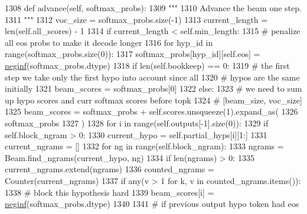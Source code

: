 \begin{DoxyCode}
1308     \textcolor{keyword}{def }advance(self, softmax\_probs):
1309         \textcolor{stringliteral}{"""}
1310 \textcolor{stringliteral}{        Advance the beam one step.}
1311 \textcolor{stringliteral}{        """}
1312         voc\_size = softmax\_probs.size(-1)
1313         current\_length = len(self.all\_scores) - 1
1314         \textcolor{keywordflow}{if} current\_length < self.min\_length:
1315             \textcolor{comment}{# penalize all eos probs to make it decode longer}
1316             \textcolor{keywordflow}{for} hyp\_id \textcolor{keywordflow}{in} range(softmax\_probs.size(0)):
1317                 softmax\_probs[hyp\_id][self.eos] = \hyperlink{namespaceparlai_1_1utils_1_1torch_a6c6e25115353dba479cd72dc31dc76ae}{neginf}(softmax\_probs.dtype)
1318         \textcolor{keywordflow}{if} len(self.bookkeep) == 0:
1319             \textcolor{comment}{# the first step we take only the first hypo into account since all}
1320             \textcolor{comment}{# hypos are the same initially}
1321             beam\_scores = softmax\_probs[0]
1322         \textcolor{keywordflow}{else}:
1323             \textcolor{comment}{# we need to sum up hypo scores and curr softmax scores before topk}
1324             \textcolor{comment}{# [beam\_size, voc\_size]}
1325             beam\_scores = softmax\_probs + self.scores.unsqueeze(1).expand\_as(
1326                 softmax\_probs
1327             )
1328             \textcolor{keywordflow}{for} i \textcolor{keywordflow}{in} range(self.outputs[-1].size(0)):
1329                 \textcolor{keywordflow}{if} self.block\_ngram > 0:
1330                     current\_hypo = self.partial\_hyps[i][1:]
1331                     current\_ngrams = []
1332                     \textcolor{keywordflow}{for} ng \textcolor{keywordflow}{in} range(self.block\_ngram):
1333                         ngrams = Beam.find\_ngrams(current\_hypo, ng)
1334                         \textcolor{keywordflow}{if} len(ngrams) > 0:
1335                             current\_ngrams.extend(ngrams)
1336                     counted\_ngrams = Counter(current\_ngrams)
1337                     \textcolor{keywordflow}{if} any(v > 1 \textcolor{keywordflow}{for} k, v \textcolor{keywordflow}{in} counted\_ngrams.items()):
1338                         \textcolor{comment}{# block this hypothesis hard}
1339                         beam\_scores[i] = \hyperlink{namespaceparlai_1_1utils_1_1torch_a6c6e25115353dba479cd72dc31dc76ae}{neginf}(softmax\_probs.dtype)
1340 
1341                 \textcolor{comment}{#  if previous output hypo token had eos}

\end{DoxyCode}
